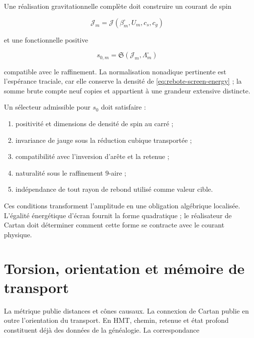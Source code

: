 Une réalisation gravitationnelle complète doit construire un courant de spin

\begin{equation}
 \mathcal J_m
 =\mathcal J(\beta_m^{\square},U_m,c_s,c_g)
 \label{eq:rebote-spin-current}
\end{equation}

et une fonctionnelle positive

\begin{equation}
 s_{0,m}=\mathfrak S(\mathcal J_m,\Lambda_m^{\square})
 \label{eq:rebote-amplitude-functional}
\end{equation}

compatible avec le raffinement. La normalisation nonadique pertinente est
l'espérance traciale, car elle conserve la densité de
\cref{eq:rebote-screen-energy} ; la somme brute compte neuf copies et appartient
à une grandeur extensive distincte.

\begin{proposition}
Un sélecteur admissible pour \(s_0\) doit satisfaire :
\begin{enumerate}[label=\roman*)]
 \item positivité et dimensions de densité de spin au carré ;
 \item invariance de jauge sous la réduction cubique transportée ;
 \item compatibilité avec l'inversion d'arête et la retenue ;
 \item naturalité sous le raffinement \(9\)-aire ;
 \item indépendance de tout rayon de rebond utilisé comme valeur cible.
\end{enumerate}
\end{proposition}

Ces conditions transforment l'amplitude en une obligation algébrique
localisée. L'égalité énergétique d'écran fournit la forme
quadratique ; le réalisateur de Cartan doit déterminer comment cette forme se
contracte avec le courant physique.

\section{Torsion, orientation et mémoire de transport}

La métrique publie distances et cônes causaux. La connexion de Cartan
publie en outre l'orientation du transport. En HMT, chemin, retenue et
état profond constituent déjà des données de la généalogie. La correspondance

